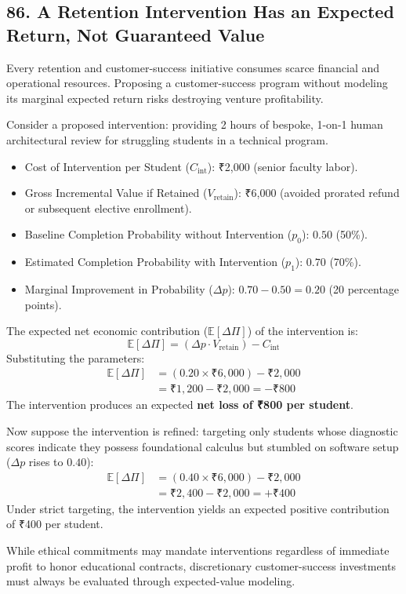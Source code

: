 \subsection*{86. A Retention Intervention Has an Expected Return, Not Guaranteed Value}

Every retention and customer-success initiative consumes scarce financial and operational resources. Proposing a customer-success program without modeling its marginal expected return risks destroying venture profitability.

Consider a proposed intervention: providing 2 hours of bespoke, 1-on-1 human architectural review for struggling students in a technical program.
\begin{itemize}[leftmargin=*]
\item Cost of Intervention per Student ($C_{\text{int}}$): ₹2,000 (senior faculty labor).
\item Gross Incremental Value if Retained ($V_{\text{retain}}$): ₹6,000 (avoided prorated refund or subsequent elective enrollment).
\item Baseline Completion Probability without Intervention ($p_0$): $0.50$ (50\%).
\item Estimated Completion Probability with Intervention ($p_1$): $0.70$ (70\%).
\item Marginal Improvement in Probability ($\Delta p$): $0.70 - 0.50 = 0.20$ (20 percentage points).
\end{itemize}

The expected net economic contribution ($\mathbb{E}[\Delta \Pi]$) of the intervention is:
\begin{equation}
\mathbb{E}[\Delta \Pi] = (\Delta p \cdot V_{\text{retain}}) - C_{\text{int}}
\end{equation}
Substituting the parameters:
\begin{equation}
\begin{aligned}
\mathbb{E}[\Delta \Pi] &= (0.20 \times \text{₹}6,000) - \text{₹}2,000 \\
&= \text{₹}1,200 - \text{₹}2,000 = -\text{₹}800
\end{aligned}
\end{equation}
The intervention produces an expected \textbf{net loss of ₹800 per student}. 

Now suppose the intervention is refined: targeting only students whose diagnostic scores indicate they possess foundational calculus but stumbled on software setup ($\Delta p$ rises to $0.40$):
\begin{equation}
\begin{aligned}
\mathbb{E}[\Delta \Pi] &= (0.40 \times \text{₹}6,000) - \text{₹}2,000 \\
&= \text{₹}2,400 - \text{₹}2,000 = +\text{₹}400
\end{aligned}
\end{equation}
Under strict targeting, the intervention yields an expected positive contribution of ₹400 per student. 

While ethical commitments may mandate interventions regardless of immediate profit to honor educational contracts, discretionary customer-success investments must always be evaluated through expected-value modeling.

